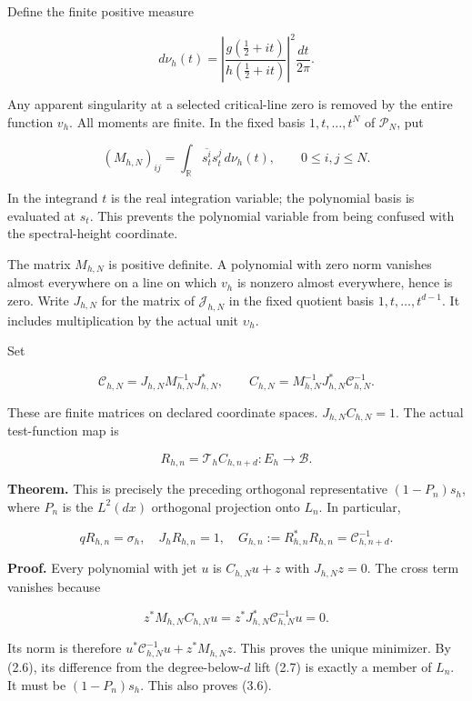 \documentclass[
]{article}
\begin{document}
Define the finite positive measure

\[\boxed{d\nu_h(t)=\left|\frac{g(\tfrac12+it)}{h(\tfrac12+it)}\right|^2\frac{dt}{2\pi}.}\tag{3.2}\]

Any apparent singularity at a selected critical-line zero is removed by
the entire function \(v_h\). All moments are finite. In the fixed basis
\(1,t,\ldots,t^N\) of \(\mathcal P_N\), put

\[(M_{h,N})_{ij}=\int_{\mathbb R}\overline{s_t^i}s_t^j\,d\nu_h(t),\qquad 0\le i,j\le N.\tag{3.3}\]

In the integrand \(t\) is the real integration variable; the polynomial
basis is evaluated at \(s_t\). This prevents the polynomial variable
from being confused with the spectral-height coordinate.

The matrix \(M_{h,N}\) is positive definite. A polynomial with zero norm
vanishes almost everywhere on a line on which \(v_h\) is nonzero almost
everywhere, hence is zero. Write \(J_{h,N}\) for the matrix of
\(\mathcal J_{h,N}\) in the fixed quotient basis \(1,t,\ldots,t^{d-1}\).
It includes multiplication by the actual unit \(\upsilon_h\).

Set

\[\boxed{\mathcal C_{h,N}=J_{h,N}M_{h,N}^{-1}J_{h,N}^*,\qquad
C_{h,N}=M_{h,N}^{-1}J_{h,N}^*\mathcal C_{h,N}^{-1}.}\tag{3.4}\]

These are finite matrices on declared coordinate spaces.
\(J_{h,N}C_{h,N}=1\). The actual test-function map is

\[R_{h,n}=\mathcal T_h C_{h,n+d}:E_h\longrightarrow\mathscr B.\tag{3.5}\]

\textbf{Theorem.} This is precisely the preceding orthogonal
representative \((1-P_n)s_h\), where \(P_n\) is the \(L^2(dx)\)
orthogonal projection onto \(L_n\). In particular,

\[\boxed{qR_{h,n}=\sigma_h,\quad J_hR_{h,n}=1,\quad
G_{h,n}:=R_{h,n}^*R_{h,n}=\mathcal C_{h,n+d}^{-1}.}\tag{3.6}\]

\textbf{Proof.} Every polynomial with jet \(u\) is \(C_{h,N}u+z\) with
\(J_{h,N}z=0\). The cross term vanishes because

\[z^*M_{h,N}C_{h,N}u=z^*J_{h,N}^*\mathcal C_{h,N}^{-1}u=0.\]

Its norm is therefore \(u^*\mathcal C_{h,N}^{-1}u+z^*M_{h,N}z\). This
proves the unique minimizer. By (2.6), its difference from the
degree-below-\(d\) lift (2.7) is exactly a member of \(L_n\). It must be
\((1-P_n)s_h\). This also proves (3.6).
\end{document}
